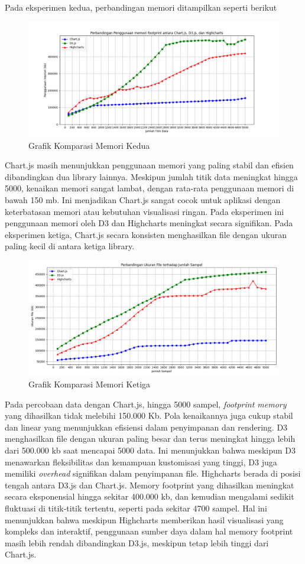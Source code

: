 Pada eksperimen kedua, perbandingan memori ditampilkan seperti berikut
	\begin{figure}[H]
	\centering
	\includegraphics[width=0.8\linewidth]{gambar/Pembahasan/FIX_Memori/Figure_2.png}
	\caption{Grafik Komparasi Memori Kedua}
	\label{Grafik Komparasi Memori Kedua}
\end{figure}
Chart.js masih menunjukkan penggunaan memori yang paling stabil dan
efisien dibandingkan dua library lainnya. Meskipun jumlah titik data
meningkat hingga 5000, kenaikan memori sangat lambat, dengan rata-rata
penggunaan memori di bawah 150 mb. Ini menjadikan Chart.js sangat cocok
untuk aplikasi dengan keterbatasan memori atau kebutuhan visualisasi ringan.
Pada eksperimen ini penggunaan memori oleh D3 dan Highcharts meningkat
secara signifikan.
Pada eksperimen ketiga, Chart.js secara konsisten menghasilkan file
dengan ukuran paling kecil di antara ketiga library.
	\begin{figure}[H]
	\centering
	\includegraphics[width=0.8\linewidth]{gambar/Pembahasan/FIX_Memori/Figure_3.png}
	\caption{Grafik Komparasi Memori Ketiga}
	\label{Grafik Komparasi Memori Ketiga}
\end{figure}
Pada percobaan data dengan Chart.js, hingga 5000 sampel, \textit{footprint memory} yang
dihasilkan tidak melebihi 150.000 Kb. Pola kenaikannya juga cukup stabil dan
linear yang menunjukkan efisiensi dalam penyimpanan dan rendering. D3 menghasilkan file dengan ukuran paling besar dan terus meningkat hingga lebih dari 500.000 kb saat
mencapai 5000 data. Ini menunjukkan bahwa meskipun D3 menawarkan
fleksibilitas dan kemampuan kustomisasi yang tinggi, D3 juga memiliki \textit{overhead}
signifikan dalam penyimpanan file. Highcharts berada di posisi tengah antara
D3.js dan Chart.js. Memory footprint yang dihasilkan meningkat secara
eksponensial hingga sekitar 400.000 kb, dan kemudian mengalami sedikit
fluktuasi di titik-titik tertentu, seperti pada sekitar 4700 sampel. Hal ini
menunjukkan bahwa meskipun Highcharts memberikan hasil visualisasi yang
kompleks dan interaktif, penggunaan sumber daya dalam hal memory footprint
masih lebih rendah dibandingkan D3.js, meskipun tetap lebih tinggi dari Chart.js.

